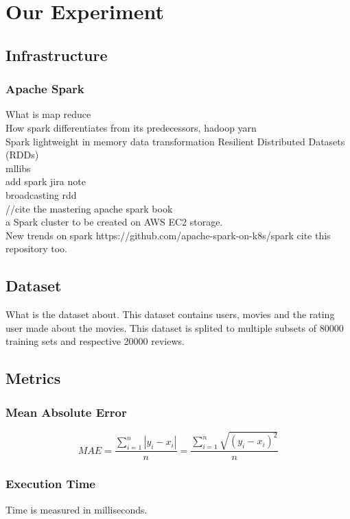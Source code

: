 \section{Our Experiment}
\subsection{Infrastructure}
\subsubsection{Apache Spark}
What is map reduce\\
How spark differentiates from its predecessors, hadoop yarn\\
Spark lightweight in memory data transformation 
Resilient Distributed Datasets (RDDs) \\
mllibs\\
add spark jira note \\
broadcasting rdd \\
//cite the mastering apache spark book
\cite{ApacheSpark:1} \\
a Spark cluster to be created on AWS EC2 storage.\\
New trends on spark https://github.com/apache-spark-on-k8s/spark cite this repository too.
\subsection{Dataset}
What is the dataset about. This dataset contains users, movies and the rating user made about the movies.
This dataset is splited to multiple subsets of 80000 training sets and respective 20000 reviews.
\cite{MovieLens:3}
\subsection{Metrics}
\subsubsection{Mean Absolute Error}
\begin{equation}
MAE = \frac{\sum_{i=1}^{n}{|y_{i}-x_{i}|} }{n} = \frac{\sum_{i=1}^{n}\sqrt{{(y_{i}-x_{i})}^{2}}}{n}
\end{equation}
\subsubsection{Execution Time}
Time is measured in milliseconds.